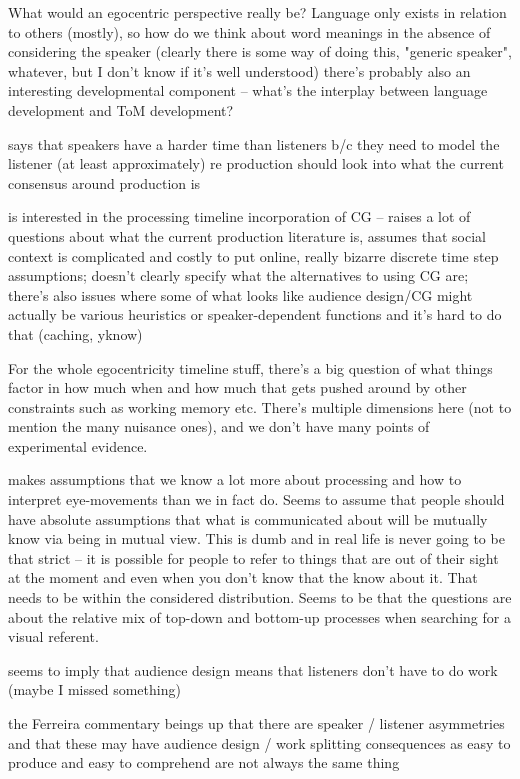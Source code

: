 \documentclass[]{article}
\begin{document}
What would an egocentric perspective really be? Language only exists in relation to others (mostly), so how do we think about word meanings in the absence of considering the speaker (clearly there is some way of doing this, "generic speaker", whatever, but I don't know if it's well understood) there's probably also an interesting developmental component -- what's the interplay between language development and ToM development? 



\cite{heller2012} says that speakers have a harder time than listeners b/c they need to model the listener (at least approximately) 
re production should look into what the current consensus around production is 


\cite{horton1996} is interested in the processing timeline incorporation of CG -- raises a lot of questions about what the current production literature is, assumes that social context is complicated and costly to put online, really bizarre discrete time step assumptions; doesn't clearly specify what the alternatives to using CG are; there's also issues where some of what looks like audience design/CG might actually be various heuristics or speaker-dependent functions and it's hard to do that (caching, yknow) 

For the whole egocentricity timeline stuff, there's a big question of what things factor in how much when and how much that gets pushed around by other constraints such as working memory etc. There's multiple dimensions here (not to mention the many nuisance ones), and we don't have many points of experimental evidence. 

\cite{keysar2000} makes assumptions that we know a lot more about processing and how to interpret eye-movements than we in fact do. Seems to assume that people should have absolute assumptions that what is communicated about will be mutually know via being in mutual view. This is dumb and in real life is never going to be that strict -- it is possible for people to refer to things that are out of their sight at the moment and even when you don't know that the know about it. That needs to be within the considered distribution. Seems to be that the questions are about the relative mix of top-down and bottom-up processes when searching for a visual referent. 

\cite{keysar2000} seems to imply that audience design means that listeners don't have to do work (maybe I missed something) 

\cite{pickering2004} the Ferreira commentary beings up that there are speaker / listener asymmetries and that these may have audience design / work splitting consequences as easy to produce and easy to comprehend are not always the same thing 
\end{document}

